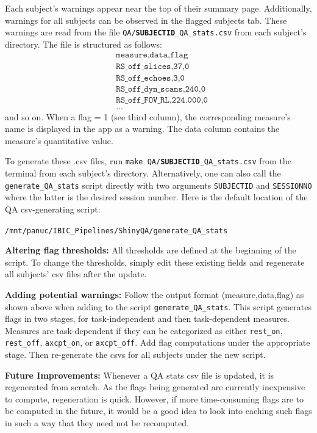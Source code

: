 \documentclass[12pt]{article}
\begin{document}
Each subject's warnings appear near the top of their summary page. Additionally, warnings for all subjects can be observed in the flagged subjects tab. These warnings are read from the file \texttt{QA/\textbf{SUBJECTID}\_QA\_stats.csv} from each subject's directory. The file is structured as follows:
\begin{align*}
	& \texttt{measure,data,flag}\\
	& \texttt{RS\_off\_slices,37,0}\\
	& \texttt{RS\_off\_echoes,3,0}\\
	& \texttt{RS\_off\_dyn\_scans,240,0}\\
	& \texttt{RS\_off\_FOV\_RL,224.000,0}\\
	& ...
\end{align*}
and so on. When a flag = 1 (see third column), the corresponding measure's name is displayed in the app as a warning. The data column contains the measure's quantitative value.

To generate these .csv files, run \texttt{make QA/\textbf{SUBJECTID}\_QA\_stats.csv} from the terminal from each subject's directory. Alternatively, one can also call the \texttt{generate\_QA\_stats} script directly with two arguments \texttt{SUBJECTID} and \texttt{SESSIONNO} where the latter is the desired session number. Here is the default location of the QA csv-generating script:
\begin{center}
	\texttt{/mnt/panuc/IBIC\_Pipelines/ShinyQA/generate\_QA\_stats}
\end{center}

\textbf{Altering flag thresholds:} All thresholds are defined at the beginning of the script. To change the thresholds, simply edit these existing fields and regenerate all subjects' csv files after the update.

\textbf{Adding potential warnings:} Follow the output format (measure,data,flag) as shown above when adding to the script \texttt{generate\_QA\_stats}. This script generates flags in two stages, for task-independent and then task-dependent measures. Measures are task-dependent if they can be categorized as either \texttt{rest\_on}, \texttt{rest\_off}, \texttt{axcpt\_on}, or \texttt{axcpt\_off}. Add flag computations under the appropriate stage. Then re-generate the csvs for all subjects under the new script. 

\textbf{Future Improvements:} Whenever a QA stats csv file is updated, it is regenerated from scratch. As the flags being generated are currently inexpensive to compute, regeneration is quick. However, if more time-consuming flags are to be computed in the future, it would be a good idea to look into caching such flags in such a way that they need not be recomputed. 
\end{document}
